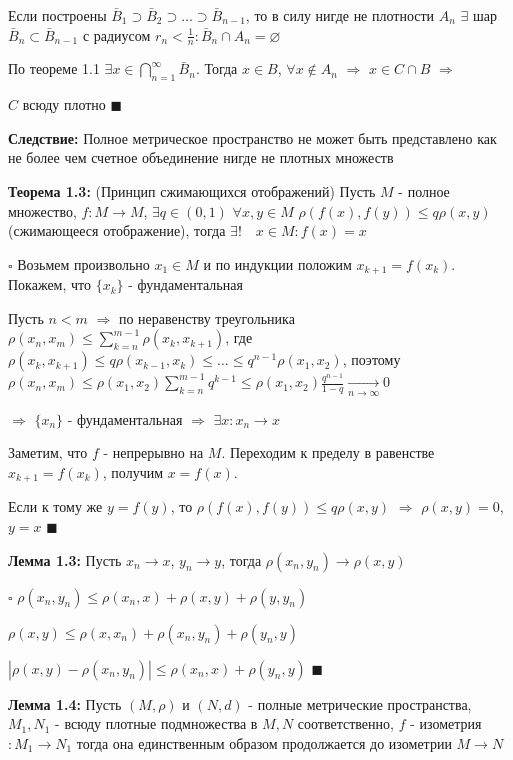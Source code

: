 \documentclass[a4paper]{report}
\begin{document}
Если построены $\bar B_1\supset\bar B_2\supset\ldots\supset\bar B_{n-1}$, то в силу нигде не плотности $A_n$ $\exists$
шар $\bar B_n\subset\bar B_{n-1}$ с радиусом $r_n<\frac1n\colon\bar B_n\cap A_n=\varnothing$

По теореме 1.1 $\exists x\in\bigcap\limits_{n=1}^\infty\bar B_n$. Тогда $x\in B$, $\forall x\notin A_n$ $\Rightarrow$
$x\in C\cap B$ $\Rightarrow$

$C$ всюду плотно $\blacksquare$
\bigskip

\noindent\textbf{Следствие:} Полное метрическое пространство не может быть представлено как не более чем счетное объединение
нигде не плотных множеств
\bigskip

\noindent\textbf{Теорема 1.3:} (Принцип сжимающихся отображений) Пусть $M$ - полное множество, $f\colon M\to M$,
$\exists q\in(0,1)$ $\forall x,y\in M$ $\rho\left(f(x),f(y)\right)\le q\rho(x,y)$ (сжимающееся отображение), тогда
$\exists!\quad x\in M\colon f(x)=x$

\noindent $\square$ Возьмем произвольно $x_1\in M$ и по индукции положим $x_{k+1}=f(x_k)$. Покажем, что $\{x_k\}$ -
фундаментальная

Пусть $n<m$ $\Rightarrow$ по неравенству треугольника $\rho(x_n,x_m)\le\sum\limits_{k=n}^{m-1}\rho(x_k,x_{k+1})$,
где $\rho(x_k,x_{k+1})\le q\rho(x_{k-1},x_k)\le\ldots\le q^{n-1}\rho(x_1,x_2)$, поэтому $\rho(x_n,x_m)\le\rho(x_1,x_2)
\sum\limits_{k=n}^{m-1}q^{k-1}\le\rho(x_1,x_2)\displaystyle\frac{q^{n-1}}{1-q}\xrightarrow[n\to\infty]{}0$

$\Rightarrow$ $\{x_n\}$ - фундаментальная $\Rightarrow$ $\exists x\colon x_n\to x$

Заметим, что $f$ - непрерывно на $M$. Переходим к пределу в равенстве $x_{k+1}=f(x_k)$, получим $x=f(x)$.

\noindent Если к тому же
$y=f(y)$, то $\rho(f(x),f(y))\le q\rho(x,y)$ $\Rightarrow$ $\rho(x,y)=0$, $y=x$ $\blacksquare$
\bigskip

\noindent\textbf{Лемма 1.3:} Пусть $x_n\to x$, $y_n\to y$, тогда $\rho(x_n,y_n)\to\rho(x,y)$

\noindent $\square$ $\rho(x_n,y_n)\le\rho(x_n,x)+\rho(x,y)+\rho(y,y_n)$

$\rho(x,y)\le\rho(x,x_n)+\rho(x_n,y_n)+\rho(y_n,y)$

$|\rho(x,y)-\rho(x_n,y_n)|\le\rho(x_n,x)+\rho(y_n,y)$ $\blacksquare$
\bigskip

\noindent\textbf{Лемма 1.4:} Пусть $(M,\rho)$ и $(N,d)$ - полные метрические пространства, $M_1,N_1$ - всюду плотные
подмножества в $M,N$ соответственно, $f$ - изометрия $\colon M_1\to N_1$ тогда она единственным образом продолжается до
изометрии $M\to N$
\end{document}
